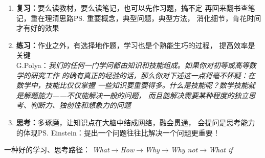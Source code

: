 \begin{itemize}
\begin{enumerate}
	  \item {\bf 复习：}要么读教材，要么读笔记，也可以先作习题，搞不定
	  再回来翻书查笔记，重在理清思路\ps{重要概念，典型问题，典型方法}，
	  消化细节，肯花时间才有好的效果
	  \item {\bf 练习：}作业之外，有选择地作题，学习也是个熟能生巧的过程，
	  提高效率是关键\\
	  G.Polya：{\it 我们的任何一门学问都由知识和技能组成。如果你对初等或高等数学的研究工作
	  的确有真正的经验的话，那么你对下述这一点将毫不怀疑：在数学中，技能比仅仅掌握
	  一些知识要重要得多。什么是技能呢？数学技能就是解题能力——不仅能解决一般的问题，
	  而且能解决需要某种程度的独立思考、判断力、独创性和想象力的问题}
	  \item {\bf 思考：}多琢磨，让知识点在大脑中结成网络，融会贯通，
	  会提问是思考能力的体现\ps{Einstein：提出一个问题往往比解决一个问题更重要！}
	\end{enumerate}
\end{itemize}

一种好的学习、思考路径：
{\it What$\to$How$\to$Why$\to$Why not$\to$What if}

